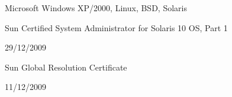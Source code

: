 \documentclass[10pt]{article}
\renewcommand{\section}[2]%
        {\pagebreak[2]\vspace{1.4\baselineskip}%
         \phantomsection\addcontentsline{toc}{section}{#1}%
         \hspace{0in}%
         \marginpar{
         \raggedright \scshape #1}#2}
\renewcommand{\subsection}[2]%
        {\pagebreak[2]\vspace{0.3\baselineskip}%
         \phantomsection\addcontentsline{toc}{subsection}{#1}%
         \hspace{0in}%
         \marginpar{\scriptsize
         \raggedright \scshape #1}#2}
\newcommand{\blankline}{\quad\pagebreak[2]}
\begin{document}
\blankline

 Microsoft Windows XP/2000, Linux, BSD,
        Solaris


Sun Certified System Administrator for Solaris 10 OS, Part 1


29/12/2009

\blankline

Sun Global Resolution Certificate


11/12/2009

\end{document}
